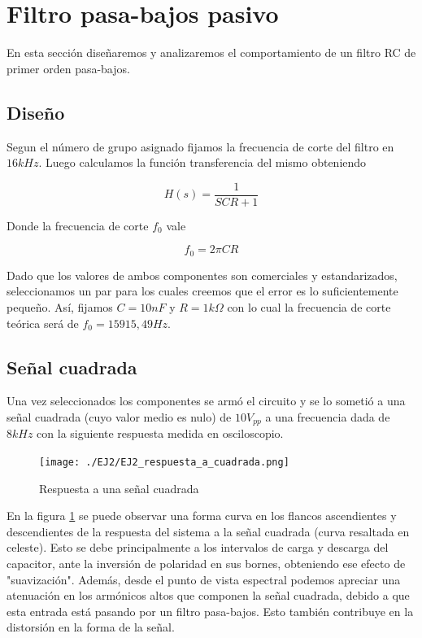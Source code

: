 
\section{Filtro pasa-bajos pasivo}

En esta secci\'on dise\~naremos y analizaremos el comportamiento de un filtro RC de primer orden pasa-bajos.

\subsection{Dise\~no}
Segun el n\'umero de grupo asignado fijamos la frecuencia de corte del filtro en $16kHz$. Luego calculamos la funci\'on transferencia del mismo obteniendo

\begin{equation}\label{ganancia_2}
H(s) = \frac{1}{SCR+1}
\end{equation}

Donde la frecuencia de corte $f_{0}$ vale

\begin{equation}\label{freccorte_2}
f_{0} = 2\pi CR
\end{equation}

Dado que los valores de ambos componentes son comerciales y estandarizados, seleccionamos un par para los cuales creemos que el error es lo suficientemente peque\~no. As\'i, fijamos $C=10nF$ y $R=1k\Omega$ con lo cual la frecuencia de corte te\'orica ser\'a de $f_{0}=15915,49Hz$.

\subsection{Se\~nal cuadrada}

Una vez seleccionados los componentes se arm\'o el circuito y se lo someti\'o a una se\~nal cuadrada (cuyo valor medio es nulo) de $10V_{pp}$ a una frecuencia dada de $8kHz$ con la siguiente respuesta medida en osciloscopio.

\begin{figure}[H]
    \centering
    \texttt{[image: ./EJ2/EJ2\_respuesta\_a\_cuadrada.png]}
    \caption{Respuesta a una se\~nal cuadrada}
    \label{fig: rtacuad_2} 
\end{figure}

En la figura \ref{fig: rtacuad_2} se puede observar una forma curva en los flancos ascendientes y descendientes de la respuesta del sistema a la se\~nal cuadrada (curva resaltada en celeste). Esto se debe principalmente a los intervalos de carga y descarga del capacitor, ante la inversi\'on de polaridad en sus bornes, obteniendo ese efecto de "suavizaci\'on". Adem\'as, desde el punto de vista espectral podemos apreciar una atenuaci\'on en los arm\'onicos altos que componen la se\~nal cuadrada, debido a que esta entrada est\'a pasando por un filtro pasa-bajos. Esto tambi\'en contribuye en la distorsi\'on en la forma de la se\~nal.

